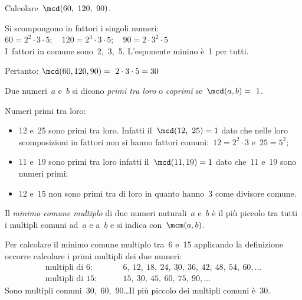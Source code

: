  \begin{esempio}
 Calcolare~\(\mcd(60,~120,~90)\).

Si scompongono in fattori i singoli numeri:\\
\(60 = 2^2\cdot3\cdot5; 
\quad 120 = 2^3\cdot3\cdot5; 
\quad 90 = 2\cdot3^2\cdot5\)\\
I~fattori in comune sono~2,~3,~5. L'esponente minino è~1 per tutti.

Pertanto: \quad \(\mcd(60,120,90)=~2\cdot3\cdot5=30\)
 \end{esempio}

\begin{definizione}
 Due numeri~\(a\) e~\(b\) si dicono \emph{primi tra loro} o \emph{coprimi} 
 se~\(\mcd(a,b) =~1\).
\end{definizione}

 \begin{esempio}
 Numeri primi tra loro:
 \begin{itemize} [noitemsep]
 \item 12 e~25 sono primi tra loro. Infatti il~\(\mcd(12,~25)=1\) dato che 
  nelle loro scomposizioni in fattori non si hanno fattori 
  comuni:~\(12 =2^2\cdot3\) e~\(25=5^2\);
 \item 11 e~19 sono primi tra loro infatti il~\(\mcd(11,19)=1\) dato che~11 
  e~19 sono numeri primi;
 \item 12 e~15 non sono primi tra di loro in quanto hanno~3 come divisore 
  comune.
 \end{itemize}
 \end{esempio}

\begin{definizione}
 Il \emph{minimo comune multiplo} di due numeri naturali~\(a\) e~\(b\) è il più
 piccolo tra tutti i multipli comuni ad~\(a\) e a~\(b\) 
 e si indica con~\(\mcm(a,b)\).
\end{definizione}

Per calcolare il minimo comune multiplo tra~6 e~15 applicando la 
definizione 
occorre calcolare i primi multipli dei due numeri:
\begin{align*}
\text{multipli di }6: & 
\qquad~6,~12,~18,~24,~\underline{30},~36,~42,~48,~54,~60,\ldots \\
\text{multipli di }15: & \qquad~15,~\underline{30},~45,~60,~75,~90,\ldots
\end{align*}
Sono multipli comuni~30,~60,~90\ldots Il più piccolo dei multipli comuni 
è~30.

